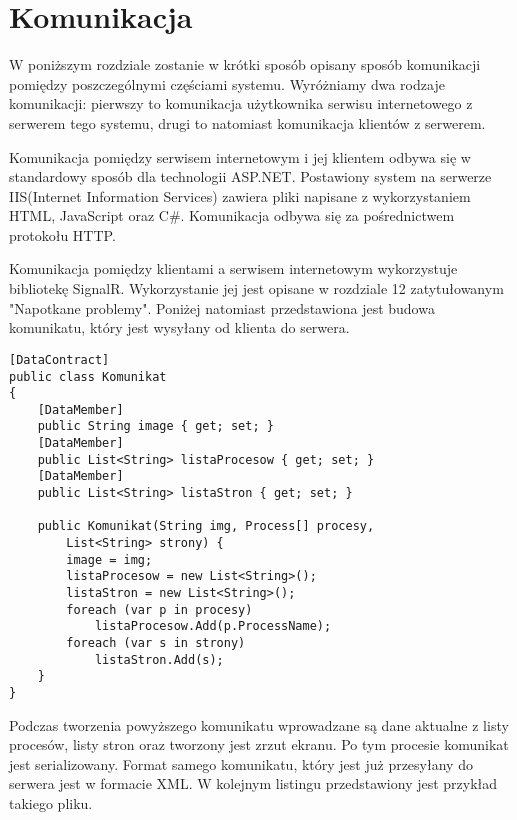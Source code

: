 \section{Komunikacja}

W poniższym rozdziale zostanie w krótki sposób opisany sposób komunikacji pomiędzy poszczególnymi częściami systemu. Wyróżniamy dwa rodzaje komunikacji: pierwszy to komunikacja użytkownika serwisu internetowego z serwerem tego systemu, drugi to natomiast komunikacja klientów z serwerem. 

\vspace{0.5cm}

Komunikacja pomiędzy serwisem internetowym i jej klientem odbywa się w standardowy sposób dla technologii ASP.NET. Postawiony system na serwerze IIS(Internet Information Services) zawiera pliki napisane z wykorzystaniem HTML, JavaScript oraz C#. Komunikacja odbywa się za pośrednictwem protokołu HTTP.
\vspace{0.5cm}

Komunikacja pomiędzy klientami a serwisem internetowym wykorzystuje bibliotekę SignalR. Wykorzystanie jej jest opisane w rozdziale 12 zatytułowanym "Napotkane problemy". Poniżej natomiast przedstawiona jest budowa komunikatu, który jest wysyłany od klienta do serwera. 

\vspace{0.5cm}
\begin{lstlisting}[frame=single,captionpos=b,
    caption={Fragment kodu przedstawiający budowę klasy Komunikat},
    label={lst:kod1},
    style=sharpc]
[DataContract]
public class Komunikat
{
    [DataMember]
    public String image { get; set; }
    [DataMember]
    public List<String> listaProcesow { get; set; }
    [DataMember]
    public List<String> listaStron { get; set; }

    public Komunikat(String img, Process[] procesy,
        List<String> strony) {
        image = img;
        listaProcesow = new List<String>();
        listaStron = new List<String>();
        foreach (var p in procesy)
            listaProcesow.Add(p.ProcessName);
        foreach (var s in strony)
            listaStron.Add(s);
    }
}
\end{lstlisting}

Podczas tworzenia powyższego komunikatu wprowadzane są
 dane aktualne z listy procesów, listy stron oraz tworzony jest zrzut ekranu. Po tym procesie komunikat jest serializowany. Format samego komunikatu, który jest już przesyłany do serwera jest w formacie XML. W kolejnym listingu przedstawiony jest przykład takiego pliku.
 
